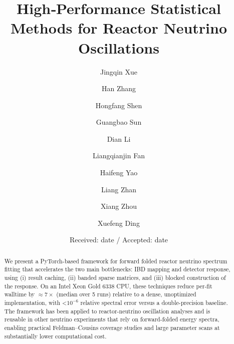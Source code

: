 \documentclass[xetex,twocolumn,epjc3]{svjour3}
\begin{document}
\justifying

\title{High‑Performance Statistical Methods for Reactor Neutrino Oscillations}

\author{Jingqin Xue
        \and Han Zhang
        \and Hongfang Shen
        \and Guangbao Sun
        \and Dian Li
        \and Liangqianjin Fan
        \and Haifeng Yao
        \and Liang Zhan
        \and Xiang Zhou
        \and Xuefeng Ding
}




\date{Received: date / Accepted: date}

\maketitle

\begin{abstract}
\begin{justify}
We present a PyTorch-based framework for forward folded reactor neutrino spectrum fitting that accelerates the two main bottlenecks: IBD mapping and detector response, using (i) result caching, (ii) banded sparse matrices, and (iii) blocked construction of the response. On an Intel Xeon Gold 6338 CPU, these techniques reduce per-fit walltime by $\approx 7\times$ (median over 5 runs) relative to a dense, unoptimized implementation, with <$10^{-6}$ relative spectral error versus a double-precision baseline. The framework has been applied to reactor-neutrino oscillation analyses and is reusable in other neutrino experiments that rely on forward-folded energy spectra, enabling practical Feldman–Cousins coverage studies and large parameter scans at substantially lower computational cost.
\end{justify}
\end{abstract}
\end{document}
